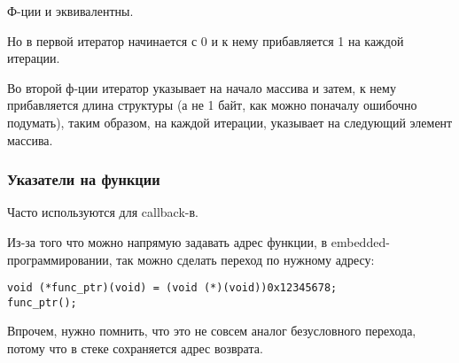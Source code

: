 Ф-ции  и  эквивалентны.

Но в первой итератор  начинается с 0 и к нему прибавляется 1 на каждой итерации.

Во второй ф-ции итератор  указывает на начало массива и затем, к нему прибавляется длина структуры 
(а не 1 байт, как можно поначалу ошибочно подумать),
таким образом, на каждой итерации,  указывает на следующий элемент массива.

\subsubsection{Указатели на функции}

Часто используются для callback-в.

Из-за того что можно напрямую задавать адрес функции, в embedded-программировании,
так можно сделать переход по нужному адресу:

\begin{lstlisting}
void (*func_ptr)(void) = (void (*)(void))0x12345678;
func_ptr();
\end{lstlisting}

Впрочем, нужно помнить, что это не совсем аналог безусловного перехода, потому что в стеке 
сохраняется адрес возврата.

